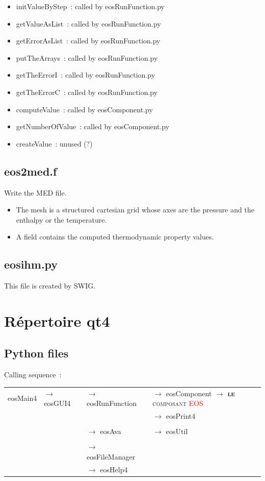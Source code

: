 \documentclass[10pt,a4paper]{article}
\begin{document}
\begin{itemize}
\item initValueByStep : called by eosRunFunction.py
\item getValueAsList : called by eosRunFunction.py
\item getErrorAsList : called by eosRunFunction.py
\item putTheArrays : called by eosRunFunction.py
\item getTheErrorI : called by eosRunFunction.py
\item getTheErrorC : called by eosRunFunction.py
\item computeValue : called by eosComponent.py
\item getNumberOfValue : called by eosComponent.py
\item createValue : unused (?)
\end{itemize}

\subsection{eos2med.f }

Write the MED file. 
\begin{itemize}
\item The mesh is a structured cartesian grid whose axes are the pressure and the enthalpy or the temperature. 
\item A field contains the computed thermodynamic property values.
\end{itemize} 

\subsection{eosihm.py}

This file is created by SWIG.

\section{Répertoire qt4}

\subsection{Python files}

Calling sequence :

\begin{tabular}{|l|l|l|l|}
\hline
eosMain4 & $\rightarrow$ eosGUI4 & $\rightarrow$ eosRunFunction & $\rightarrow$ eosComponent $\rightarrow$ \textsc{\textbf{le} composant \textcolor{red}{EOS}}\\
         &         &                & $\rightarrow$ eosPrint4     \\
 & & & \\
         &         & $\rightarrow$ eosAva         &  $\rightarrow$ eosUtil     \\
 & & & \\
         &         & $\rightarrow$ eosFileManager &             \\
         &         & $\rightarrow$ eosHelp4       &             \\
\hline
\end{tabular}
\end{document}
